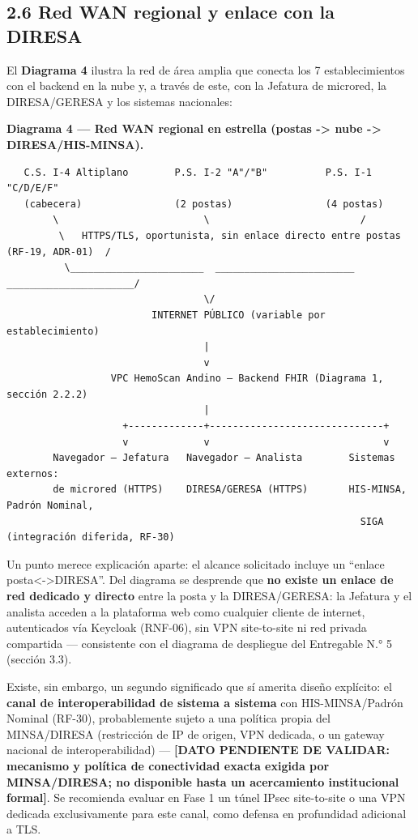 \documentclass[11pt,a4paper]{article}
\begin{document}
\subsection{2.6 Red WAN regional y enlace con la DIRESA}\label{red-wan-regional-y-enlace-con-la-diresa}

El \textbf{Diagrama 4} ilustra la red de área amplia que conecta los 7 establecimientos con el backend en la nube y, a través de este, con la Jefatura de microred, la DIRESA/GERESA y los sistemas nacionales:

\textbf{Diagrama 4 --- Red WAN regional en estrella (postas -\textgreater{} nube -\textgreater{} DIRESA/HIS-MINSA).}

\begin{samepage}\begin{verbatim}
   C.S. I-4 Altiplano        P.S. I-2 "A"/"B"          P.S. I-1 "C/D/E/F"
   (cabecera)                (2 postas)                (4 postas)
        \                         \                          /
         \   HTTPS/TLS, oportunista, sin enlace directo entre postas (RF-19, ADR-01)  /
          \_______________________  ________________________  ______________________/
                                  \/
                         INTERNET PÚBLICO (variable por establecimiento)
                                  |
                                  v
                  VPC HemoScan Andino — Backend FHIR (Diagrama 1, sección 2.2.2)
                                  |
                    +-------------+------------------------------+
                    v             v                              v
        Navegador — Jefatura   Navegador — Analista        Sistemas externos:
        de microred (HTTPS)    DIRESA/GERESA (HTTPS)       HIS-MINSA, Padrón Nominal,
                                                             SIGA (integración diferida, RF-30)
\end{verbatim}\end{samepage}

Un punto merece explicación aparte: el alcance solicitado incluye un ``enlace posta\textless-\textgreater DIRESA''. Del diagrama se desprende que \textbf{no existe un enlace de red dedicado y directo} entre la posta y la DIRESA/GERESA: la Jefatura y el analista acceden a la plataforma web como cualquier cliente de internet, autenticados vía Keycloak (RNF-06), sin VPN site-to-site ni red privada compartida --- consistente con el diagrama de despliegue del Entregable N.° 5 (sección 3.3).

Existe, sin embargo, un segundo significado que sí amerita diseño explícito: el \textbf{canal de interoperabilidad de sistema a sistema} con HIS-MINSA/Padrón Nominal (RF-30), probablemente sujeto a una política propia del MINSA/DIRESA (restricción de IP de origen, VPN dedicada, o un gateway nacional de interoperabilidad) --- \textbf{{[}DATO PENDIENTE DE VALIDAR: mecanismo y política de conectividad exacta exigida por MINSA/DIRESA; no disponible hasta un acercamiento institucional formal{]}}. Se recomienda evaluar en Fase 1 un túnel IPsec site-to-site o una VPN dedicada exclusivamente para este canal, como defensa en profundidad adicional a TLS.
\end{document}
